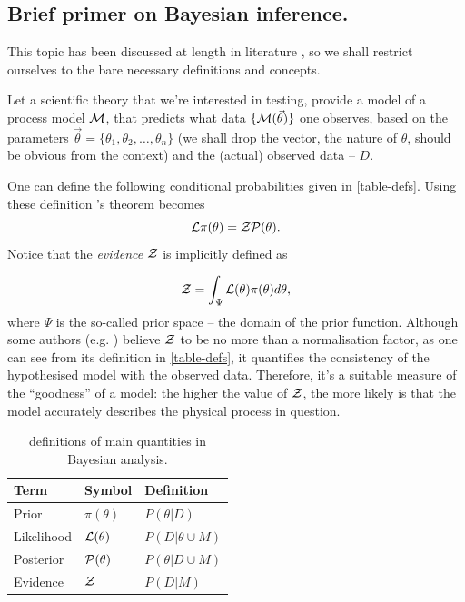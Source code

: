 \documentclass[usenatbib]{mnras}
\begin{document}
\subsection{Brief primer on Bayesian inference.}
\label{sec:orgf7f68b6}

This topic has been discussed at length in literature
\citep{jeffreys2010scientific}, so we shall restrict ourselves to the
bare necessary definitions and concepts.

Let a scientific theory that we're interested in testing, provide a
model of a process model \({\cal M}\), that predicts what data \(\lbrace {\cal M}(\vec{\theta})\rbrace\) one observes, based on the
parameters \(\vec{\theta} = \lbrace \theta_1, \theta_2, \ldots,
   \theta_n \rbrace\) (we shall drop the vector, the nature of
\(\theta\), should be obvious from the context) and the (actual)
observed data -- \(D\).

One can define the following conditional probabilities given
in \autoref{table-defs}. Using these definition \citeauthor{1763} 's theorem
becomes
\begin{equation}
 {\cal L} \pi (\theta) = {\cal Z} {\cal P} (\theta).
\label{eq:bayes} 
\end{equation}
Notice that the \emph{evidence} \({\cal Z}\) is implicitly defined as

\begin{equation}\label{eq:def-z}
 {\cal Z} = \int_{\Psi} {\cal L}(\theta) \pi(\theta) d\theta, 
\end{equation}
where \(\Psi\) is the so-called prior space -- the domain of the
prior function. Although some authors
(e.g. \citeauthor{jeffreys2010scientific}) believe \({\cal Z}\) to be
no more than a normalisation factor, as one can see from its
definition in \autoref{table-defs}, it quantifies the consistency of
the hypothesised model with the observed data. Therefore, it's a
suitable measure of the ``goodness'' of a model: the higher the
value of \({\cal Z}\), the more likely is that the model accurately
describes the physical process in question.

\begin{table}[htbp]
\caption{definitions of main quantities in Bayesian analysis. \label{table-defs}}
\centering
\begin{tabular}{lll}
\textbf{\textbf{Term}} & \textbf{\textbf{Symbol}} & \textbf{\textbf{Definition}}\\
\hline
Prior & \(\pi(\theta)\) & \(P ( \theta  \vert D)\)\\
Likelihood & \({\cal L}(\theta)\) & \(P ( D \vert \theta \cup M)\)\\
Posterior & \({\cal P}(\theta)\) & \(P ( \theta \vert D \cup M)\)\\
Evidence & \({\cal Z}\) & \(P ( D \vert M)\)\\
\end{tabular}
\end{table}
\end{document}
